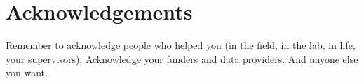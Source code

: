 \chapter{Acknowledgements}

Remember to acknowledge people who helped you (in the field, in the lab, in life, your supervisors). Acknowledge your funders and data providers. And anyone else you want.
